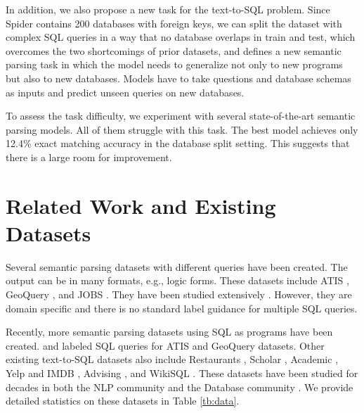 \documentclass[11pt,a4paper]{article}
\begin{document}
In addition, we also propose a new task for the text-to-SQL problem. Since Spider contains 200 databases with foreign keys, we can split the dataset with complex SQL queries in a way that no database overlaps in train and test, which overcomes the two shortcomings of prior datasets, and defines a new semantic parsing task in which the model needs to generalize not only to new programs but also to new databases. Models have to take questions and database schemas as inputs and predict unseen queries on new databases. 

To assess the task difficulty, we experiment with several state-of-the-art semantic parsing models. All of them struggle with this task.
The best model achieves only 12.4\% exact matching accuracy in the database split setting.
This suggests that there is a large room for improvement.

\section{Related Work and Existing Datasets}
\label{sec:rel}

Several semantic parsing datasets with different queries have been created. The output can be in many formats, e.g., logic forms. These datasets include ATIS \cite{Price90,Dahl94}, GeoQuery \cite{zelle96}, and JOBS \cite{tang01}. They have been studied extensively \cite{zelle96,Zettlemoyer05,wong07,Das10,Liang11,banarescu13,artzi13,Reddy14,Berant14,dong16}. However, they are domain specific and there is no standard label guidance for multiple SQL queries.

Recently, more semantic parsing datasets using SQL as programs have been created. \citet{iyer17} and \citet{Popescu03} labeled SQL queries for ATIS and GeoQuery datasets. Other existing text-to-SQL datasets also include Restaurants \cite{tang2001using,Popescu03}, Scholar \cite{iyer17}, Academic \cite{li2014constructing}, Yelp and IMDB \cite{Yaghmazadeh17}, Advising \cite{cathy18}, and WikiSQL \cite{Zhong2017}. These datasets have been studied for decades in both the NLP community \cite{warren1982efficient,popescu2003towards,popescu2004modern,li2006constructing,giordani2012translating,wang2017synthesizing,iyer17,Zhong2017,Xu2017,Yu18,pshuang2018PT-MAML,2018executionguided,P18-1068,mccann2018natural} and the Database community \cite{li2014constructing, Yaghmazadeh17}. We provide detailed statistics on these datasets in Table \ref{tb:data}. 
\end{document}
